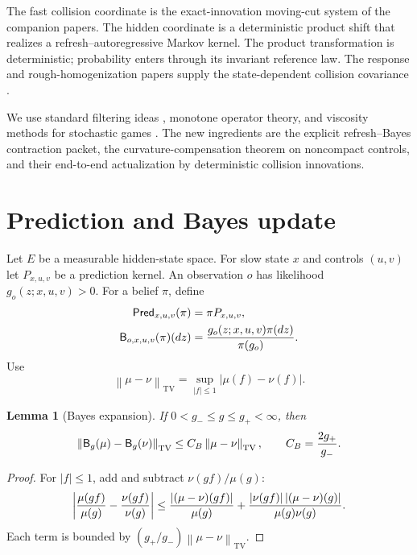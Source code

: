 \documentclass[11pt,reqno]{amsart}
\newtheorem{lemma}[theorem]{Lemma}
\theoremstyle{definition}
\theoremstyle{remark}
\newcommand{\TV}{\mathrm{TV}}
\newcommand{\norm}[1]{\left\lVert #1\right\rVert}
\newcommand{\abs}[1]{\left\lvert #1\right\rvert}
\begin{document}
The fast collision coordinate is the exact-innovation moving-cut system of the
companion papers.  The hidden coordinate is a deterministic product shift that
realizes a refresh--autoregressive Markov kernel.  The product transformation
is deterministic; probability enters through its invariant reference law.
The response and rough-homogenization papers supply the state-dependent
collision covariance \cite{QiRoughRound4}.

We use standard filtering ideas \cite{BainCrisan2009,AtarZeitouni1997,
vanHandel2009}, monotone operator theory, and viscosity methods for stochastic
games \cite{FlemingSouganidis1989,FlemingSoner2006,BuckdahnLi2008}.  The new
ingredients are the explicit refresh--Bayes contraction packet, the
curvature-compensation theorem on noncompact controls, and their end-to-end
actualization by deterministic collision innovations.

\section{Prediction and Bayes update}

Let $E$ be a measurable hidden-state space.  For slow state $x$ and controls
$(u,v)$ let $P_{x,u,v}$ be a prediction kernel.  An observation $o$ has
likelihood $g_o(z;x,u,v)>0$.  For a belief $\pi$, define
\begin{align}
 \mathsf{Pred}_{x,u,v}(\pi)&=\pi P_{x,u,v},\label{eq:pred}\\
 \mathsf B_{o,x,u,v}(\pi)(dz)&=
 {g_o(z;x,u,v)\pi(dz)\over\pi(g_o)}.\label{eq:Bayes}
\end{align}
Use
\[
 \norm{\mu-\nu}_{\TV}=
 \sup_{\abs f\le1}\abs{\mu(f)-\nu(f)}.
\]

\begin{lemma}[Bayes expansion]\label{lem:Bayes}
If $0<g_-\le g\le g_+<\infty$, then
\begin{equation}\label{eq:Bayes-Lip}
 \norm{\mathsf B_g(\mu)-\mathsf B_g(\nu)}_{\TV}
 \le C_B\norm{\mu-\nu}_{\TV},
 \qquad C_B={2g_+\over g_-}.
\end{equation}
\end{lemma}

\begin{proof}
For $\abs f\le1$, add and subtract $\nu(gf)/\mu(g)$:
\[
 \abs{{\mu(gf)\over\mu(g)}-{\nu(gf)\over\nu(g)}}
 \le {\abs{(\mu-\nu)(gf)}\over\mu(g)}
 +{\abs{\nu(gf)}\abs{(\mu-\nu)(g)}
   \over\mu(g)\nu(g)}.
\]
Each term is bounded by
$(g_+/g_-)\norm{\mu-\nu}_{\TV}$.
\end{proof}
\end{document}
